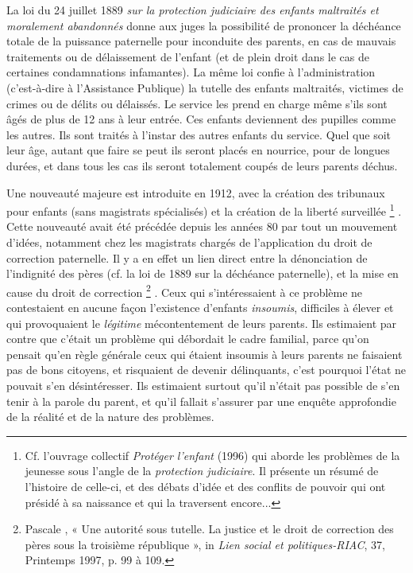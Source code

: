  La loi du 24 juillet 1889 {\emph{sur la protection judiciaire des enfants maltraités et moralement abandonnés}} donne aux juges la possibilité de prononcer la déchéance totale de la puissance paternelle pour inconduite des parents, en cas de mauvais traitements ou de délaissement de l'enfant (et de plein droit dans le cas de certaines condamnations infamantes). La même loi confie à l'administration (c'est-à-dire à l'Assistance Publique) la tutelle des enfants maltraités, victimes de crimes ou de délits ou délaissés. Le service les prend en charge même s'ils sont âgés de plus de 12 ans à leur entrée. Ces enfants deviennent des pupilles comme les autres. Ils sont traités à l'instar des autres enfants du service. Quel que soit leur âge, autant que faire se peut ils seront placés en nourrice, pour de longues durées, et dans tous les cas ils seront totalement coupés de leurs parents déchus.

 Une nouveauté majeure est introduite en 1912, avec la création des tribunaux pour enfants (sans magistrats spécialisés) et la création de la liberté surveillée%
\footnote{Cf. l'ouvrage collectif \emph{Protéger l'enfant} (1996) qui aborde les problèmes de la jeunesse sous l'angle de la \emph{protection judiciaire}. Il présente un résumé de l'histoire de celle-ci, et des débats d'idée et des conflits de pouvoir qui ont présidé à sa naissance et qui la traversent encore...}%
. Cette nouveauté avait été précédée depuis les années 80 par tout un mouvement d'idées, notamment chez les magistrats chargés de l'application du droit de correction paternelle. Il y a en effet un lien direct entre la dénonciation de l'indignité des pères (cf. la loi de 1889 sur la déchéance paternelle), et la mise en cause du droit de correction%
\footnote{Pascale , « Une autorité sous tutelle. La justice et le droit de correction des pères sous la troisième république », in \emph{Lien social et politiques-RIAC}, 37, Printemps 1997, p. 99 à 109.}%
. Ceux qui s'intéressaient à ce problème ne contestaient en aucune façon l'existence d'enfants \emph{insoumis}, difficiles à élever et qui provoquaient le \emph{légitime} mécontentement de leurs parents. Ils estimaient par contre que c'était un problème qui débordait le cadre familial, parce qu'on pensait qu'en règle générale ceux qui étaient insoumis à leurs parents ne faisaient pas de bons citoyens, et risquaient de devenir délinquants, c'est pourquoi l'état ne pouvait s'en désintéresser. Ils estimaient surtout qu'il n'était pas possible de s'en tenir à la parole du parent, et qu'il fallait s'assurer par une enquête approfondie de la réalité et de la nature des problèmes. 

